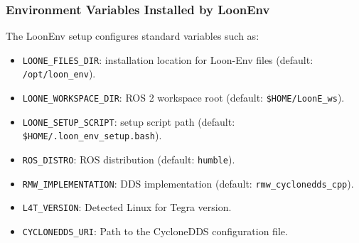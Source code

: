 \subsubsection{Environment Variables Installed by LoonEnv}

The LoonEnv setup configures standard variables such as:

\begin{itemize}
 \item \texttt{LOONE\_FILES\_DIR}: installation location for Loon-Env files (default: \texttt{/opt/loon\_env}).
 \item \texttt{LOONE\_WORKSPACE\_DIR}: ROS 2 workspace root (default: \texttt{\$HOME/LoonE\_ws}).
 \item \texttt{LOONE\_SETUP\_SCRIPT}: setup script path (default: \texttt{\$HOME/.loon\_env\_setup.bash}).
 \item \texttt{ROS\_DISTRO}: ROS distribution (default: \texttt{humble}).
 \item \texttt{RMW\_IMPLEMENTATION}: DDS implementation (default: \texttt{rmw\_cyclonedds\_cpp}).
 \item \texttt{L4T\_VERSION}: Detected Linux for Tegra version.
 \item \texttt{CYCLONEDDS\_URI}: Path to the CycloneDDS configuration file.
\end{itemize}



